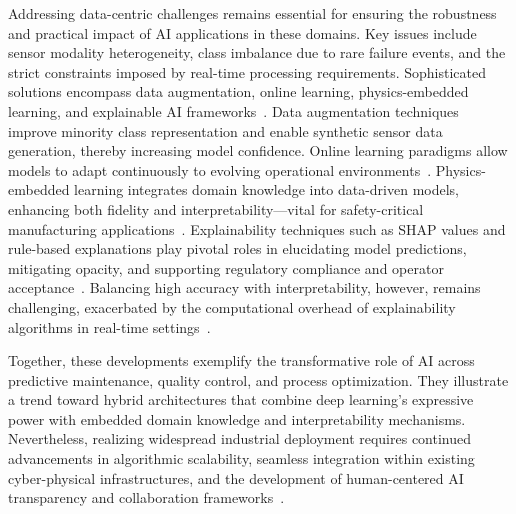 \documentclass[sigconf]{acmart}
\begin{document}
Addressing data-centric challenges remains essential for ensuring the robustness and practical impact of AI applications in these domains. Key issues include sensor modality heterogeneity, class imbalance due to rare failure events, and the strict constraints imposed by real-time processing requirements. Sophisticated solutions encompass data augmentation, online learning, physics-embedded learning, and explainable AI frameworks~\cite{ref29,ref34,ref37,ref38}. Data augmentation techniques improve minority class representation and enable synthetic sensor data generation, thereby increasing model confidence. Online learning paradigms allow models to adapt continuously to evolving operational environments~\cite{ref29}. Physics-embedded learning integrates domain knowledge into data-driven models, enhancing both fidelity and interpretability—vital for safety-critical manufacturing applications~\cite{ref34}. Explainability techniques such as SHAP values and rule-based explanations play pivotal roles in elucidating model predictions, mitigating opacity, and supporting regulatory compliance and operator acceptance~\cite{ref38}. Balancing high accuracy with interpretability, however, remains challenging, exacerbated by the computational overhead of explainability algorithms in real-time settings~\cite{ref37}.

Together, these developments exemplify the transformative role of AI across predictive maintenance, quality control, and process optimization. They illustrate a trend toward hybrid architectures that combine deep learning’s expressive power with embedded domain knowledge and interpretability mechanisms. Nevertheless, realizing widespread industrial deployment requires continued advancements in algorithmic scalability, seamless integration within existing cyber-physical infrastructures, and the development of human-centered AI transparency and collaboration frameworks~\cite{ref9,ref24,ref36}.
\end{document}
